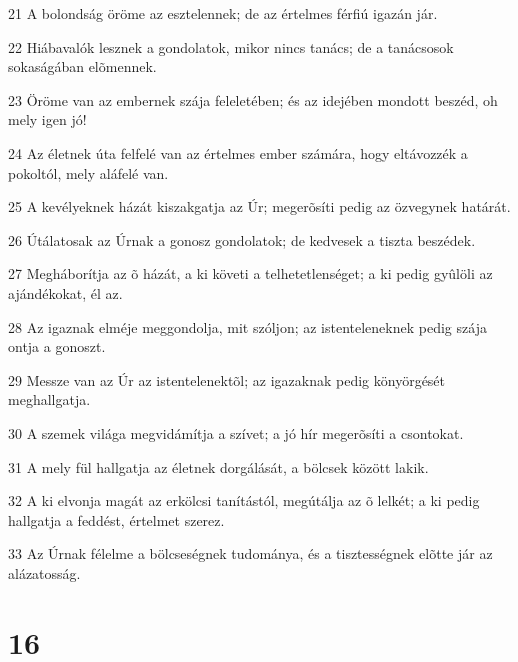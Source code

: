 \par 21 A bolondság öröme az esztelennek; de az értelmes férfiú igazán jár.
\par 22 Hiábavalók lesznek a gondolatok, mikor nincs tanács; de a tanácsosok sokaságában elõmennek.
\par 23 Öröme van az embernek szája feleletében; és az idejében mondott beszéd, oh mely igen jó!
\par 24 Az életnek úta felfelé van az értelmes ember számára, hogy eltávozzék a pokoltól, mely aláfelé van.
\par 25 A kevélyeknek házát kiszakgatja az Úr; megerõsíti pedig az özvegynek határát.
\par 26 Útálatosak az Úrnak a gonosz gondolatok; de kedvesek a tiszta beszédek.
\par 27 Megháborítja az õ házát, a ki követi a telhetetlenséget; a ki pedig gyûlöli az ajándékokat, él az.
\par 28 Az igaznak elméje meggondolja, mit szóljon; az istenteleneknek pedig szája ontja a gonoszt.
\par 29 Messze van az Úr az istentelenektõl; az igazaknak pedig könyörgését meghallgatja.
\par 30 A szemek világa megvidámítja a szívet; a jó hír megerõsíti a csontokat.
\par 31 A mely fül hallgatja az életnek dorgálását, a bölcsek között lakik.
\par 32 A ki elvonja magát az erkölcsi tanítástól, megútálja az õ lelkét; a ki pedig hallgatja a feddést, értelmet szerez.
\par 33 Az Úrnak félelme a bölcseségnek tudománya, és a tisztességnek elõtte jár az  alázatosság.

\chapter{16}

